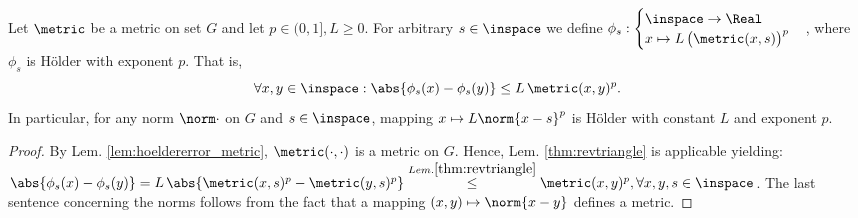 \begin{thm}\label{thm:pmetricphoelder}
Let $\metric$ be a metric on set $G$ and let $p \in (0,1], L \geq 0$. For arbitrary $s \in \inspace $ we define $\phi_s:\begin{cases}  \inspace \to \Real \\ x \mapsto L \, \bigl(\metric (x,s) \bigr)^p\end{cases}$, where 
$\phi_s $ is H\"older with exponent $p$. That is, \[\forall x,y \in \inspace : \abs{\phi_s(x) - \phi_s(y) } \leq L \, \metric (x,y)^p. \]
In particular, for any norm $\norm \cdot$ on $G$ and $s \in \inspace $, mapping $x \mapsto L \norm{x-s}^p$ is H\"older with constant $L$ and exponent $p$.
\begin{proof}
By Lem. \ref{lem:hoeldererror_metric}, $\metric(\cdot,\cdot)$ is a metric on $G$. Hence, Lem. \ref{thm:revtriangle} is applicable yielding:
$\abs{\phi_s(x) - \phi_s(y)} = L \, \abs{\metric(x,s)^p - \metric(y,s)^p} \stackrel{Lem. \ref{thm:revtriangle} } {\leq} \metric(x,y)^p, \forall x,y,s \in \inspace$. The last sentence concerning the norms follows from the fact that a mapping $(x,y) \mapsto \norm{x-y}$ defines a metric.
\end{proof}
\end{thm}



